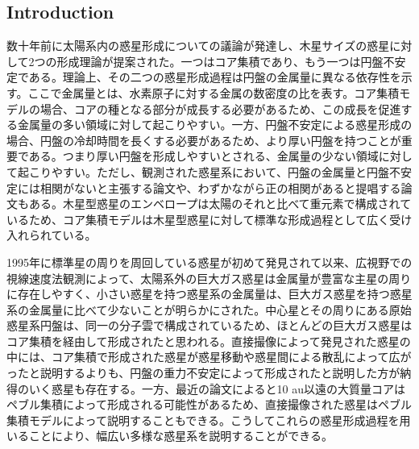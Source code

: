 \documentclass[twocolumn, dvipdfmx]{aastex62}
\begin{document}
\begin{CJK*}{UTF8}{min}
\section{Introduction} \label{sec:introduction}

数十年前に太陽系内の惑星形成についての議論が発達し\citep{1985Arizona}、木星サイズの惑星に対して2つの形成理論が提案された。一つはコア集積であり\citep{1974Icar...22..416P, 1980PThPh..64..544M, 1996Icar..124...62P}、もう一つは円盤不安定である\citep{1951PNAS...37....1K, 1997Sci...276.1836B, 2002Sci...298.1756M}。理論上、その二つの惑星形成過程は円盤の金属量に異なる依存性を示す。ここで金属量とは、水素原子に対する金属の数密度の比を表す。コア集積モデルの場合、コアの種となる部分が成長する必要があるため、この成長を促進する金属量の多い領域に対して起こりやすい\citep{2004ApJ...616..567I, 2012A&A...541A..97M}。一方、円盤不安定による惑星形成の場合、円盤の冷却時間を長くする必要があるため、より厚い円盤を持つことが重要である。つまり厚い円盤を形成しやすいとされる、金属量の少ない領域に対して起こりやすい\citep{2006ApJ...636L.149C, 2007Arizona}。ただし、観測された惑星系において、円盤の金属量と円盤不安定には相関がないと主張する論文\citep{2002ApJ...567L.149B}や、わずかながら正の相関があると提唱する論文\citep{2007ApJ...661L..77M}もある。木星型惑星のエンベロープは太陽のそれと比べて重元素で構成されているため\citep{2003NewAR..47....1Y}、コア集積モデルは木星型惑星に対して標準な形成過程として広く受け入れられている。

1995年に標準星の周りを周回している惑星が初めて発見されて以来\citep{1995Natur.378..355M}、広視野での視線速度法観測によって、太陽系外の巨大ガス惑星は金属量が豊富な主星の周りに存在しやすく\citep{2003A&A...398..363S, 2005ApJ...622.1102F}、小さい惑星を持つ惑星系の金属量は、巨大ガス惑星を持つ惑星系の金属量に比べて少ないことが明らかにされた\citep{2011arXiv1109.2497M, 2015AJ....149...14W}。中心星とその周りにある原始惑星系円盤は、同一の分子雲で構成されているため、ほとんどの巨大ガス惑星はコア集積を経由して形成されたと思われる\citep{2004ApJ...616..567I, 2012A&A...541A..97M}。直接撮像によって発見された惑星の中には、コア集積で形成された惑星が惑星移動や惑星間による散乱によって広がったと説明するよりも、円盤の重力不安定によって形成されたと説明した方が納得のいく惑星も存在する\citep{2009ApJ...707...79D}。一方、最近の論文によると10 au以遠の大質量コアはペブル集積によって形成される可能性があるため\citep{2010A&A...520A..43O, 2012A&A...544A..32L}、直接撮像された惑星はペブル集積モデルによって説明することもできる。こうしてこれらの惑星形成過程を用いることにより、幅広い多様な惑星系を説明することができる。


\end{CJK*}
\end{document}
